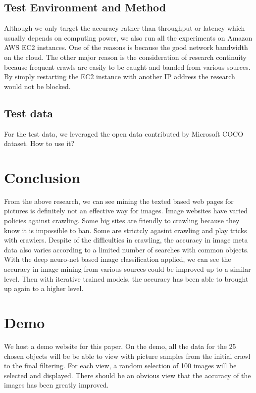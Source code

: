\documentclass[paper=a4, fontsize=11pt]{scrartcl}
\numberwithin{equation}{section}		%
\numberwithin{figure}{section}			%
\numberwithin{table}{section}				%
\begin{document}
\begin{multicols}{2}
\subsection{Test Environment and Method}
Although we only target the accuracy rather than throughput or latency which usually depends on computing power, we also run all the experiments on Amazon AWS EC2 instances. One of the reasons is because the good network bandwidth on the cloud. The other major reason is the consideration of research continuity because frequent crawls are easily to be caught and banded from various sources. By simply restarting the EC2 instance with another IP address the research would not be blocked. 

\subsection{Test data}
For the test data, we leveraged the open data contributed by Microsoft COCO dataset. How to use it?

\section{Conclusion}
From the above research, we can see mining the texted based web pages for pictures is definitely not an effective way for images. Image websites have varied policies against crawling. Some big sites are friendly to crawling because they know it is impossible to ban. Some are strictcly agasint crawling and play tricks with crawlers. Despite of the difficulties in crawling, the accuracy in image meta data also varies according to a limited number of searches with common objects. With the deep neuro-net based image classification applied, we can see the accuracy in image mining from various sources could be improved up to a similar level. Then with iterative trained models, the accuracy has been able to brought up again to a higher level.

\section{Demo}

We host a demo website for this paper. On the demo, all the data for the 25 chosen objects will be be able to view with picture samples from the initial crawl to the final filtering. For each view, a random selection of 100 images will be selected and displayed. There should be an obvious view that the accuracy of the images has been greatly improved.


\end{multicols}
\end{document}
